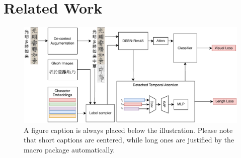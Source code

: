 \section{Related Work}
\begin{figure}
    \includegraphics[width=\textwidth]{figure/paper-overall.drawio.pdf}
    \caption{A figure caption is always placed below the illustration.
    Please note that short captions are centered, while long ones are
    justified by the macro package automatically.} 
    \label{fig:overall}
\end{figure}
